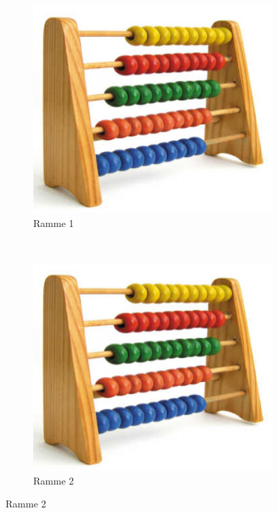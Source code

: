 \documentclass[a4paper]{article}
\begin{document}
\begin{figure}[h]
    \centering
    \begin{subfigure}[b]{0.3\linewidth}
        \includegraphics[width=\textwidth]{kuleramme}
        \caption{Ramme 1}
        \label{fig:ramme1}
    \end{subfigure}
    ~ 
    \begin{subfigure}[b]{0.3\linewidth}
        \includegraphics[width=\textwidth]{kuleramme}
        \caption{Ramme 2}

\end{subfigure}
\end{figure}
\end{document}
